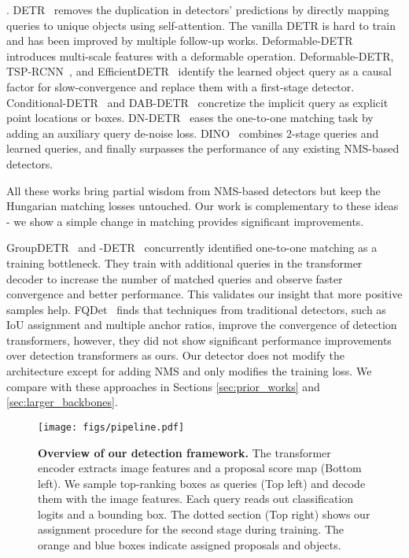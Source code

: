 \documentclass[10pt,twocolumn,letterpaper]{article}
\newcommand{\myparagraph}[1]{\vspace{2pt}\noindent{\textbf{#1}}}
\newcommand{\nmsdets}{{NMS-based detectors\xspace}}
\newcommand{\lblfig}[1]{\label{fig:#1}}
\begin{document}
\myparagraph{End-to-end detectors}.
DETR~\cite{carion2020end} removes the duplication in detectors' predictions by directly mapping queries to unique objects using self-attention.
The vanilla DETR is hard to train and has been improved by multiple follow-up works.
Deformable-DETR~\cite{zhu2020deformable} introduces multi-scale features with a deformable operation.
Deformable-DETR, TSP-RCNN~\cite{sun2020rethinking}, and EfficientDETR~\cite{yao2021efficient} identify the learned object query as a causal factor for slow-convergence and replace them with a first-stage detector.
Conditional-DETR~\cite{meng2021conditional} and DAB-DETR~\cite{liu2022dab} concretize the implicit query as explicit point locations or boxes.
DN-DETR~\cite{li2022dn} eases the one-to-one matching task by adding an auxiliary query de-noise loss.
DINO~\cite{zhang2022dino} combines 2-stage queries and learned queries, and finally surpasses the performance of any existing \nmsdets.

All these works bring partial wisdom from \nmsdets{} but keep the Hungarian matching losses untouched.
Our work is complementary to these ideas - we show a simple change in matching provides significant improvements.

GroupDETR~\cite{chen2022group} and -DETR~\cite{jia2022detrs} concurrently identified one-to-one matching as a training bottleneck.
They train with additional queries in the transformer decoder to increase the number of matched queries and observe faster convergence and better performance.
This validates our insight that more positive samples help.
FQDet~\cite{picron2022fqdet} finds that techniques from traditional detectors, such as IoU assignment and multiple anchor ratios, improve the convergence of detection transformers, however, they did not show significant performance improvements over detection transformers as ours.
Our detector does not modify the architecture except for adding NMS and only modifies the training loss. 
We compare with these approaches in Sections \ref{sec:prior_works} and \ref{sec:larger_backbones}.


\begin{figure*}
    \centering
    \texttt{[image: figs/pipeline.pdf]}
    \caption{
    \textbf{Overview of our detection framework.}
    The transformer encoder extracts image features and a proposal score map (Bottom left).
    We sample top-ranking boxes as queries (Top left) and decode them with the image features.
    Each query reads out classification logits and a bounding box.
    The dotted section (Top right) shows our assignment procedure for the second stage during training.
    The \textcolor{mytangoorange}{orange} and \textcolor{mytangoblue}{blue} boxes indicate assigned proposals and objects.
    }
    \lblfig{pipeline}
\end{figure*}
\end{document}
